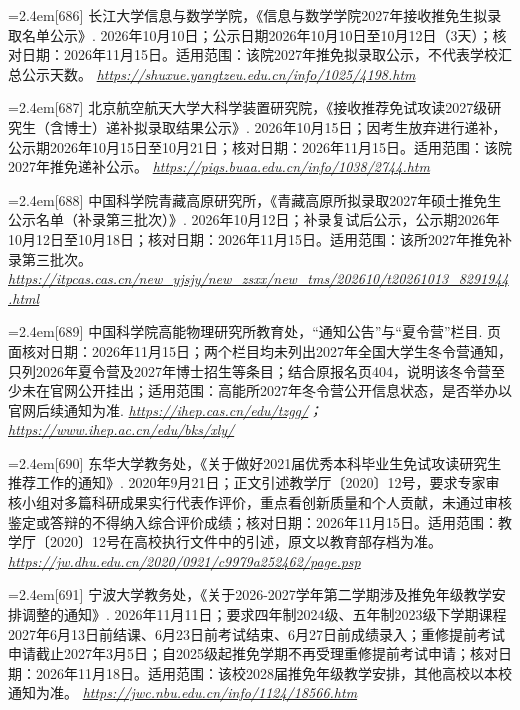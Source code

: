 \par\noindent\hangindent=2.4em\label{src:S0832}{\color{cAccent}[686]} 长江大学信息与数学学院，《信息与数学学院2027年接收推免生拟录取名单公示》. 2026年10月10日；公示日期2026年10月10日至10月12日（3天）；核对日期：2026年11月15日。适用范围：该院2027年推免拟录取公示，不代表学校汇总公示天数。 \textit{\url{https://shuxue.yangtzeu.edu.cn/info/1025/4198.htm}}\par
\par\noindent\hangindent=2.4em\label{src:S0833}{\color{cAccent}[687]} 北京航空航天大学大科学装置研究院，《接收推荐免试攻读2027级研究生（含博士）递补拟录取结果公示》. 2026年10月15日；因考生放弃进行递补，公示期2026年10月15日至10月21日；核对日期：2026年11月15日。适用范围：该院2027年推免递补公示。 \textit{\url{https://piqs.buaa.edu.cn/info/1038/2744.htm}}\par
\par\noindent\hangindent=2.4em\label{src:S0834}{\color{cAccent}[688]} 中国科学院青藏高原研究所，《青藏高原所拟录取2027年硕士推免生公示名单（补录第三批次）》. 2026年10月12日；补录复试后公示，公示期2026年10月12日至10月18日；核对日期：2026年11月15日。适用范围：该所2027年推免补录第三批次。 \textit{\url{https://itpcas.cas.cn/new_yjsjy/new_zsxx/new_tms/202610/t20261013_8291944.html}}\par
\par\noindent\hangindent=2.4em\label{src:S0835}{\color{cAccent}[689]} 中国科学院高能物理研究所教育处，“通知公告”与“夏令营”栏目. 页面核对日期：2026年11月15日；两个栏目均未列出2027年全国大学生冬令营通知，只列2026年夏令营及2027年博士招生等条目；结合原报名页404，说明该冬令营至少未在官网公开挂出；适用范围：高能所2027年冬令营公开信息状态，是否举办以官网后续通知为准. \textit{\url{https://ihep.cas.cn/edu/tzgg/}；\url{https://www.ihep.ac.cn/edu/bks/xly/}}\par
\par\noindent\hangindent=2.4em\label{src:S0836}{\color{cAccent}[690]} 东华大学教务处，《关于做好2021届优秀本科毕业生免试攻读研究生推荐工作的通知》. 2020年9月21日；正文引述教学厅〔2020〕12号，要求专家审核小组对多篇科研成果实行代表作评价，重点看创新质量和个人贡献，未通过审核鉴定或答辩的不得纳入综合评价成绩；核对日期：2026年11月15日。适用范围：教学厅〔2020〕12号在高校执行文件中的引述，原文以教育部存档为准。 \textit{\url{https://jw.dhu.edu.cn/2020/0921/c9979a252462/page.psp}}\par
\par\noindent\hangindent=2.4em\label{src:S0837}{\color{cAccent}[691]} 宁波大学教务处，《关于2026-2027学年第二学期涉及推免年级教学安排调整的通知》. 2026年11月11日；要求四年制2024级、五年制2023级下学期课程2027年6月13日前结课、6月23日前考试结束、6月27日前成绩录入；重修提前考试申请截止2027年3月5日；自2025级起推免学期不再受理重修提前考试申请；核对日期：2026年11月18日。适用范围：该校2028届推免年级教学安排，其他高校以本校通知为准。 \textit{\url{https://jwc.nbu.edu.cn/info/1124/18566.htm}}\par

